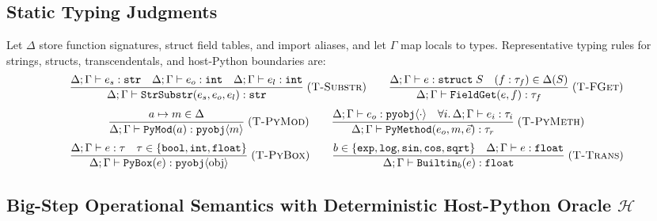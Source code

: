 \documentclass[11pt,a4paper]{article}
\begin{document}
\subsection{Static Typing Judgments}

Let $\Delta$ store function signatures, struct field tables, and import aliases, and let $\Gamma$ map locals to types. Representative typing rules for strings, structs, transcendentals, and host-Python boundaries are:
\[
\frac{\Delta;\Gamma \vdash e_s : \texttt{str} \quad \Delta;\Gamma \vdash e_o : \texttt{int} \quad \Delta;\Gamma \vdash e_l : \texttt{int}}{\Delta;\Gamma \vdash \texttt{StrSubstr}(e_s, e_o, e_l) : \texttt{str}}\;(\textsc{T-Substr})
\qquad
\frac{\Delta;\Gamma \vdash e : \texttt{struct}\;S \quad (f : \tau_f) \in \Delta(S)}{\Delta;\Gamma \vdash \texttt{FieldGet}(e, f) : \tau_f}\;(\textsc{T-FGet})
\]
\[
\frac{a \mapsto m \in \Delta}{\Delta;\Gamma \vdash \texttt{PyMod}(a) : \texttt{pyobj}\langle m \rangle}\;(\textsc{T-PyMod})
\qquad
\frac{\Delta;\Gamma \vdash e_o : \texttt{pyobj}\langle\cdot\rangle \quad \forall i.\,\Delta;\Gamma \vdash e_i : \tau_i}{\Delta;\Gamma \vdash \texttt{PyMethod}(e_o, m, \vec{e}) : \tau_r}\;(\textsc{T-PyMeth})
\]
\[
\frac{\Delta;\Gamma \vdash e : \tau \quad \tau \in \{\texttt{bool},\texttt{int},\texttt{float}\}}{\Delta;\Gamma \vdash \texttt{PyBox}(e) : \texttt{pyobj}\langle\text{obj}\rangle}\;(\textsc{T-PyBox})
\qquad
\frac{b \in \{\texttt{exp},\texttt{log},\texttt{sin},\texttt{cos},\texttt{sqrt}\} \quad \Delta;\Gamma \vdash e : \texttt{float}}{\Delta;\Gamma \vdash \texttt{Builtin}_b(e) : \texttt{float}}\;(\textsc{T-Trans})
\]

\subsection{Big-Step Operational Semantics with Deterministic Host-Python Oracle $\mathcal{H}$}
\end{document}
